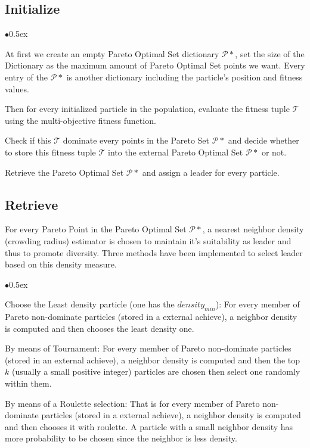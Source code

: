 \documentclass[11pt, runningheads,a4paper]{llncs}
\begin{document}
\subsection{Initialize}
\begin{list}{$\bullet$}{\itemsep 0.5ex}

\item At first we create an empty Pareto Optimal Set dictionary $\mathcal{P}*$, set the size of the Dictionary as the maximum amount of Pareto Optimal Set points we want. Every entry of the $\mathcal{P}*$ is another dictionary including the particle's position and fitness values.
\item Then for every initialized particle in the population, evaluate the fitness tuple $\mathcal{T}$ using the multi-objective fitness function.
\item Check if this $\mathcal{T}$ dominate every points in the Pareto Set $\mathcal{P}*$ and decide whether to store this fitness tuple $\mathcal{T}$ into the external Pareto Optimal Set $\mathcal{P}*$ or not.
\item Retrieve the Pareto Optimal Set $\mathcal{P}*$ and assign a leader for every particle.
\end{list}

\subsection{Retrieve}

   For every Pareto Point in the Pareto Optimal Set $\mathcal{P}*$, a nearest neighbor density (crowding radius) estimator is chosen to maintain it's suitability as leader and thus to promote diversity. Three methods have been implemented to select leader based on this density measure.

\begin{list}{$\bullet$}{\itemsep 0.5ex}
\item Choose the Least density particle (one has the $density_{min}$): For every member of Pareto non-dominate particles (stored in a external achieve), a neighbor density is computed and then chooses the least density one.
\item By means of Tournament: For every member of Pareto non-dominate particles (stored in an external achieve), a neighbor density is computed and then the top $k$ (usually a small positive integer) particles are chosen then select one randomly within them.
\item By means of a Roulette selection: That is for every member of Pareto non-dominate particles (stored in a external achieve), a neighbor density is computed and then chooses it with roulette. A particle with a small neighbor density has more probability to be chosen since the neighbor is less density. 
\end{list}
\end{document}
